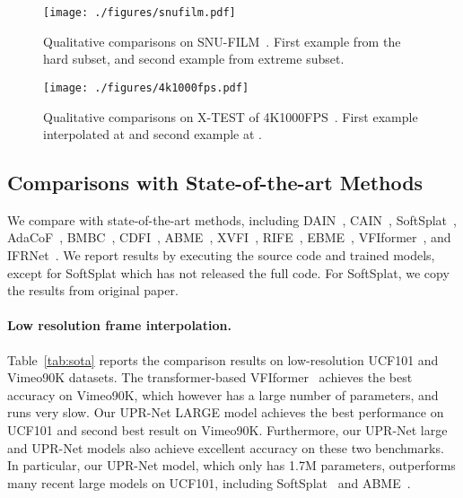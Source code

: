 \documentclass[10pt,twocolumn,letterpaper]{article}
\begin{document}
\begin{figure*}[!htb]
\centering
\texttt{[image: ./figures/snufilm.pdf]}
\caption{
    Qualitative comparisons on SNU-FILM~\cite{choi2020channel}. First example
    from the hard subset, and second example from extreme subset.
}
\label{fig:vis-snufilm}
\end{figure*}




\begin{figure*}[!htb]
\centering
\texttt{[image: ./figures/4k1000fps.pdf]}
\caption{
    Qualitative comparisons on X-TEST of 4K1000FPS~\cite{sim2021xvfi}. First
    example interpolated at  and second example at .
}
\vspace{-0.25cm}
\label{fig:vis-4k1000fps}
\end{figure*}



\subsection{Comparisons with State-of-the-art Methods}


We compare with state-of-the-art methods, including DAIN~\cite{bao2019depth},
CAIN~\cite{choi2020channel}, SoftSplat~\cite{niklaus2020softmax},
AdaCoF~\cite{lee2020adacof}, BMBC~\cite{park2020bmbc}, CDFI~\cite{ding2021cdfi},
ABME~\cite{park2021asymmetric},  XVFI~\cite{sim2021xvfi},
RIFE~\cite{huang2020rife}, EBME~\cite{jin2022enhanced},
VFIformer~\cite{lu2022video}, and IFRNet~\cite{kong2022ifrnet}. We report
results by executing the source code and trained models, except for SoftSplat
which has not released the full code. For SoftSplat, we copy the results from
original paper.


\paragraph{Low resolution frame interpolation.}
Table~\ref{tab:sota} reports the comparison results on low-resolution UCF101 and
Vimeo90K datasets. The transformer-based VFIformer~\cite{lu2022video} achieves
the best accuracy on Vimeo90K, which however has a large number of parameters,
and runs very slow.  Our UPR-Net LARGE model achieves the best performance on
UCF101 and second best result on Vimeo90K.  Furthermore, our UPR-Net large and
UPR-Net models also achieve excellent accuracy on these two benchmarks. In
particular, our UPR-Net model, which only has 1.7M parameters, outperforms many
recent large models on UCF101, including SoftSplat~\cite{niklaus2020softmax} and
ABME~\cite{park2021asymmetric}.
\end{document}
